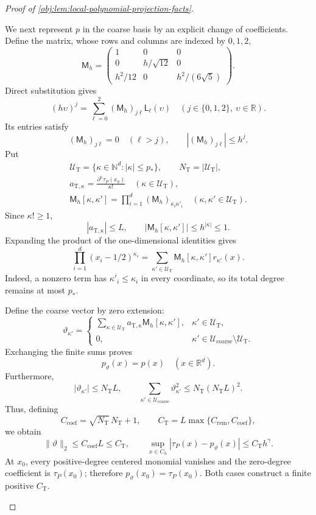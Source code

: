 \documentclass[11pt]{article}
\begin{document}
\begin{proof}[Proof of \cref{obj:lem:local-polynomial-projection-facts}]
\begin{enumerate}
We next represent \(p\) in the coarse basis by an explicit change of coefficients.
Define the matrix, whose rows and columns are indexed by \(0,1,2\),
\[
\mathsf M_h=
\begin{pmatrix}
1&0&0\\
0&h/\sqrt{12}&0\\
h^2/12&0&h^2/(6\sqrt5)
\end{pmatrix}.
\]
Direct substitution gives
\[
(h\upsilon)^j
 =\sum_{\ell=0}^2(\mathsf M_h)_{j\ell}\mathsf L_\ell(\upsilon)
 \quad(j\in\{0,1,2\},\ \upsilon\in\mathbb R).
\]
Its entries satisfy
\[
(\mathsf M_h)_{j\ell}=0\quad(\ell>j),
\qquad
|(\mathsf M_h)_{j\ell}|\le h^j.
\]
Put
\[
\begin{gathered}
\mathcal U_{\mathrm T}
 =\{\kappa\in\mathbb N^d:|\kappa|\le p_*\},
\qquad
N_{\mathrm T}=|\mathcal U_{\mathrm T}|,\\
a_{\mathrm T,\kappa}
 =\frac{\partial^\kappa\tau_P(x_0)}{\kappa!}
 \quad(\kappa\in\mathcal U_{\mathrm T}),\\
\mathsf M_h[\kappa,\kappa']
 =\prod_{i=1}^d(\mathsf M_h)_{\kappa_i\kappa'_i}
 \quad(\kappa,\kappa'\in\mathcal U_{\mathrm T}).
\end{gathered}
\]
Since \(\kappa!\ge1\),
\[
|a_{\mathrm T,\kappa}|\le L,
\qquad
|\mathsf M_h[\kappa,\kappa']|
 \le h^{|\kappa|}\le1.
\]
Expanding the product of the one-dimensional identities gives
\[
\prod_{i=1}^d(x_i-1/2)^{\kappa_i}
 =\sum_{\kappa'\in\mathcal U_{\mathrm T}}
   \mathsf M_h[\kappa,\kappa']r_{\kappa'}(x).
\]
Indeed, a nonzero term has \(\kappa'_i\le\kappa_i\) in every coordinate,
so its total degree remains at most \(p_*\).

Define the coarse vector by zero extension:
\[
\vartheta_{\kappa'}=
\begin{cases}
\displaystyle\sum_{\kappa\in\mathcal U_{\mathrm T}}
 a_{\mathrm T,\kappa}\mathsf M_h[\kappa,\kappa'],
 &\kappa'\in\mathcal U_{\mathrm T},\\
0,&\kappa'\in\mathcal U_{\mathrm{coarse}}\setminus\mathcal U_{\mathrm T}.
\end{cases}
\]
Exchanging the finite sums proves
\[
p_\vartheta(x)=p(x)\quad(x\in\mathbb R^d).
\]
Furthermore,
\[
|\vartheta_{\kappa'}|\le N_{\mathrm T}L,
\qquad
\sum_{\kappa'\in\mathcal U_{\mathrm{coarse}}}
 \vartheta_{\kappa'}^2
 \le N_{\mathrm T}(N_{\mathrm T}L)^2.
\]
Thus, defining
\[
C_{\mathrm{coef}}=\sqrt{N_{\mathrm T}}\,N_{\mathrm T}+1,
\qquad
C_{\mathrm T}=L\max\{C_{\mathrm{rem}},C_{\mathrm{coef}}\},
\]
we obtain
\[
\|\vartheta\|_2\le C_{\mathrm{coef}}L\le C_{\mathrm T},
\qquad
\sup_{x\in C_h}|\tau_P(x)-p_\vartheta(x)|
 \le C_{\mathrm T}h^\gamma.
\]
At \(x_0\), every positive-degree centered monomial vanishes and the
zero-degree coefficient is \(\tau_P(x_0)\); therefore
\(p_\vartheta(x_0)=\tau_P(x_0)\).
Both cases construct a finite positive \(C_{\mathrm T}\).


\end{enumerate}
\end{proof}
\end{document}
